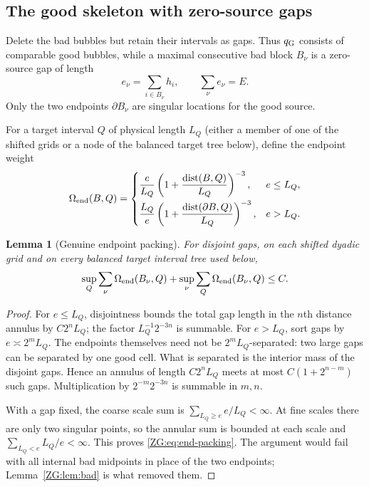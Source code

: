 \documentclass[11pt]{amsart}
\numberwithin{equation}{section}
\newtheorem{lemma}[theorem]{Lemma}
\theoremstyle{definition}
\theoremstyle{remark}
\begin{document}
\subsection{The good skeleton with zero-source gaps}

Delete the bad bubbles but retain their intervals as gaps.  Thus
$q_{\rm G}$ consists of comparable good bubbles, while a maximal
consecutive bad block $B_\nu$ is a zero-source gap of length
\begin{equation}\label{ZG:eq:gaps}
 e_\nu=\sum_{i\in B_\nu}h_i,
 \qquad \sum_\nu e_\nu=E.
\end{equation}
Only the two endpoints $\partial B_\nu$ are singular locations for the
good source.

For a target interval $Q$ of physical length $L_Q$ (either a member of
one of the shifted grids or a node of the balanced target tree below),
define the endpoint weight
\begin{equation}\label{ZG:eq:Omega-end}
 \Omega_{\rm end}(B,Q)=
 \begin{cases}
 \displaystyle \frac e{L_Q}
 \left(1+\frac{\operatorname {dist}(B,Q)}{L_Q}\right)^{-3},
 &e\le L_Q,\\[3mm]
 \displaystyle \frac {L_Q}e
 \left(1+\frac{\operatorname {dist}(\partial B,Q)}{L_Q}\right)^{-3},
 &e>L_Q.
 \end{cases}
\end{equation}

\begin{lemma}[Genuine endpoint packing]\label{ZG:lem:end-packing}
For disjoint gaps, on each shifted dyadic grid and on every balanced
target interval tree used below,
\begin{equation}\label{ZG:eq:end-packing}
 \sup_Q\sum_\nu\Omega_{\rm end}(B_\nu,Q)
 +\sup_\nu\sum_Q\Omega_{\rm end}(B_\nu,Q)\le C.
\end{equation}
\end{lemma}

\begin{proof}
For $e\le L_Q$, disjointness bounds the total gap length in the $n$th
distance annulus by $C2^nL_Q$; the factor
$L_Q^{-1}2^{-3n}$ is summable.  For $e>L_Q$, sort gaps by
$e\asymp2^mL_Q$.  The endpoints themselves need not be
$2^mL_Q$-separated: two large gaps can be separated by one good cell.
What is separated is the interior mass of the disjoint gaps.  Hence an
annulus of length $C2^nL_Q$ meets at most
$C(1+2^{n-m})$ such gaps.  Multiplication by
$2^{-m}2^{-3n}$ is summable in $m,n$.

With a gap fixed, the coarse scale sum is
$\sum_{L_Q\ge e}e/L_Q<\infty$.  At fine scales there are only two
singular points, so the annular sum is bounded at each scale and
$\sum_{L_Q<e}L_Q/e<\infty$.  This proves \eqref{ZG:eq:end-packing}.  The
argument would fail with all internal bad midpoints in place of the two
endpoints; Lemma~\ref{ZG:lem:bad} is what removed them.
\end{proof}
\end{document}

